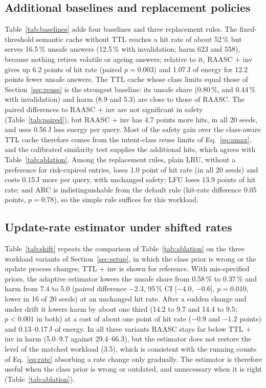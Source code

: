 \documentclass[journal]{IEEEtran}
\newcommand{\pct}{\,\%}
\begin{document}
\subsection{Additional baselines and replacement policies}\label{sec:baselines}
Table~\ref{tab:baselines} adds four baselines and three replacement rules. The fixed-threshold semantic cache without TTL reaches a hit rate of about 52\pct{} but serves 16.5\pct{} unsafe answers (12.5\pct{} with invalidation; harm 623 and 558), because nothing retires volatile or ageing answers; relative to it, RAASC $+$ inv gives up 6.2 points of hit rate (paired $p=0.003$) and 1.07\,J of energy for 12.2 points fewer unsafe answers. The TTL cache whose class limits equal those of Section~\ref{sec:reuse} is the strongest baseline: its unsafe share (0.80\pct{}, and 0.44\pct{} with invalidation) and harm (8.9 and 5.3) are close to those of RAASC. The paired differences to RAASC $+$ inv are not significant in safety (Table~\ref{tab:paired}), but RAASC $+$ inv has 4.7 points more hits, in all 20 seeds, and uses 0.56\,J less energy per query. Most of the safety gain over the class-aware TTL cache therefore comes from the intent-class reuse limits of Eq.~\eqref{eq:amax}, and the calibrated similarity test supplies the additional hits, which agrees with Table~\ref{tab:ablation}. Among the replacement rules, plain LRU, without a preference for risk-expired entries, loses 1.0 point of hit rate (in all 20 seeds) and costs 0.15\,J more per query, with unchanged safety; LFU loses 13.9 points of hit rate; and ARC \cite{megiddo2003} is indistinguishable from the default rule (hit-rate difference 0.05 points, $p=0.78$), so the simple rule suffices for this workload.

\subsection{Update-rate estimator under shifted rates}\label{sec:shift}
Table~\ref{tab:shift} repeats the comparison of Table~\ref{tab:ablation} on the three workload variants of Section~\ref{sec:setup}, in which the class prior is wrong or the update process changes; TTL $+$ inv is shown for reference. With mis-specified priors, the adaptive estimator lowers the unsafe share from 0.58\pct{} to 0.37\pct{} and harm from 7.4 to 5.0 (paired difference $-2.3$, 95\pct{} CI [$-4.0$, $-0.6$], $p=0.010$, lower in 16 of 20 seeds) at an unchanged hit rate. After a sudden change and under drift it lowers harm by about one third (14.2 to 9.7 and 14.4 to 9.5; $p<0.001$ in both) at a cost of about one point of hit rate ($-0.9$ and $-1.2$ points) and 0.13--0.17\,J of energy. In all three variants RAASC stays far below TTL $+$ inv in harm (5.0--9.7 against 29.4--66.3), but the estimator does not restore the level of the matched workload (3.5), which is consistent with the running counts of Eq.~\eqref{eq:rate} absorbing a rate change only gradually. The estimator is therefore useful when the class prior is wrong or outdated, and unnecessary when it is right (Table~\ref{tab:ablation}).
\end{document}
